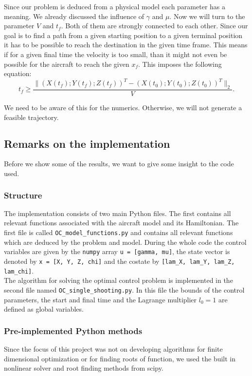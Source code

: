 \documentclass[a4paper]{article}
\theoremstyle{definitions}
\theoremstyle{bemerkung}
\theoremstyle{satz}
\theoremstyle{satz}
\newcommand{\code}[1]{\colorbox{backcolour}{\texttt{#1}}}
\begin{document}
Since our problem is deduced from a physical model each parameter has a meaning. We already discussed the influence of $\gamma$ and $\mu$. Now we will turn to the parameter $V$ and $t_f$. Both of them are strongly connected to each other. Since our goal is to find a path from a given starting position to a given terminal position it has to be possible to reach the destination in the given time frame. This means if for a given final time the velocity is too small, than it might not even be possible for the aircraft to reach the given $x_f$.
This imposes the following equation:
\[
    t_f\geq \frac{\| (X(t_f);Y(t_f);Z(t_f))^T- (X(t_0);Y(t_0);Z(t_0))^T\|_2}{V}.
\]

We need to be aware of this for the numerics. Otherwise, we will not generate a feasible trajectory. 

\subsection{Remarks on the implementation}

Before we show some of the results, we want to give some insight to the code used.

\subsubsection{Structure}

The implementation consists of two main Python files. The first contains all relevant functions associated with the aircraft model and its Hamiltonian. The first file is called \code{OC\_model\_functions.py} and contains all relevant functions which are deduced by the problem and model. During the whole code the control variables are given by the \code{numpy} array \code{u = [gamma, mu]}, the state vector is denoted by \code{x = [X, Y, Z, chi]} and the costate by \code{[lam\_X, lam\_Y, lam\_Z, lam\_chi]}.\\

The algorithm for solving the optimal control problem is implemented in the second file named \code{OC\_single\_shooting.py}. In this file the bounds of the control parameters, the start and final time and the Lagrange multiplier $l_0 =1$ are defined as global variables.

\subsubsection{Pre-implemented Python methods}
Since the focus of this project was not on developing algorithms for finite dimensional optimization or for finding roots of function, we used the built in nonlinear solver and root finding methods from scipy. 
\end{document}
